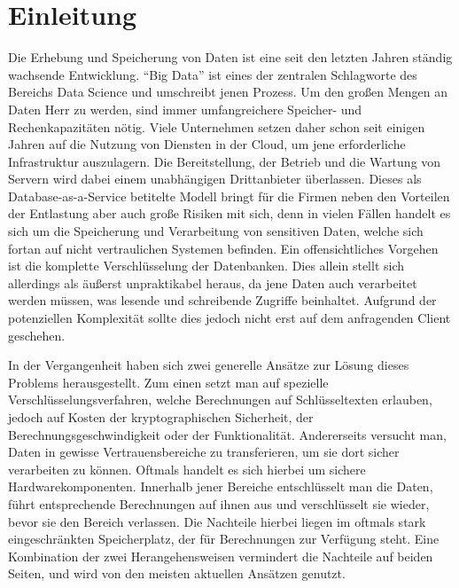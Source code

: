 
\chapter{Einleitung}

Die Erhebung und Speicherung von Daten ist eine seit den letzten Jahren ständig wachsende Entwicklung. "`Big Data"' ist eines der zentralen Schlagworte des Bereichs Data Science und umschreibt jenen Prozess. Um den großen Mengen an Daten Herr zu werden, sind immer umfangreichere Speicher- und Rechenkapazitäten nötig. Viele Unternehmen setzen daher schon seit einigen Jahren auf die Nutzung von Diensten in der Cloud, um jene erforderliche Infrastruktur auszulagern. Die Bereitstellung, der Betrieb und die Wartung von Servern wird dabei einem unabhängigen Drittanbieter überlassen. Dieses als Database-as-a-Service betitelte Modell bringt für die Firmen neben den Vorteilen der Entlastung aber auch große Risiken mit sich, denn in vielen Fällen handelt es sich um die Speicherung und Verarbeitung von sensitiven Daten, welche sich fortan auf nicht vertraulichen Systemen befinden. Ein offensichtliches Vorgehen ist die komplette Verschlüsselung der Datenbanken. Dies allein stellt sich allerdings als äußerst unpraktikabel heraus, da jene Daten auch verarbeitet werden müssen, was lesende und schreibende Zugriffe beinhaltet. Aufgrund der potenziellen Komplexität sollte dies jedoch nicht erst auf dem anfragenden Client geschehen.

In der Vergangenheit haben sich zwei generelle Ansätze zur Lösung dieses Problems herausgestellt. Zum einen setzt man auf spezielle Verschlüsselungsverfahren, welche Berechnungen auf Schlüsseltexten erlauben, jedoch auf Kosten der kryptographischen Sicherheit, der Berechnungsgeschwindigkeit oder der Funktionalität. Andererseits versucht man, Daten in gewisse Vertrauensbereiche zu transferieren, um sie dort sicher verarbeiten zu können. Oftmals handelt es sich hierbei um sichere Hardwarekomponenten. Innerhalb jener Bereiche entschlüsselt man die Daten, führt entsprechende Berechnungen auf ihnen aus und verschlüsselt sie wieder, bevor sie den Bereich verlassen. Die Nachteile hierbei liegen im oftmals stark eingeschränkten Speicherplatz, der für Berechnungen zur Verfügung steht. Eine Kombination der zwei Herangehensweisen vermindert die Nachteile auf beiden Seiten, und wird von den meisten aktuellen Ansätzen genutzt.
 
